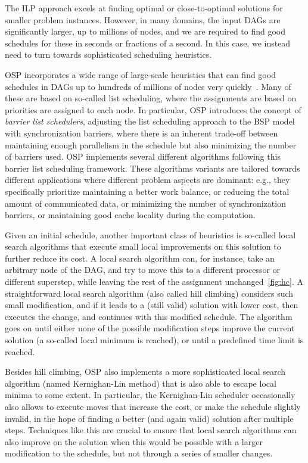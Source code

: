 \documentclass[oneside,reqno, a4paper]{amsart}
\numberwithin{equation}{section}
\begin{document}
The ILP approach excels at finding optimal or close-to-optimal solutions for smaller problem instances. However, in many domains, the input DAGs are significantly larger, up to millions of nodes, and we are required to find good schedules for these in seconds or fractions of a second. In this case, we instead need to turn towards sophisticated scheduling heuristics.

OSP incorporates a wide range of large-scale heuristics that can find good schedules in DAGs up to hundreds of millions of nodes very quickly~\cite{BSP_algos_opdas,sptrsv_opdas}. Many of these are based on so-called list scheduling, where the assignments are based on priorities are assigned to each node. In particular, OSP introduces the concept of \emph{barrier list schedulers}, adjusting the list scheduling approach to the BSP model with synchronization barriers, where there is an inherent trade-off between maintaining enough parallelism in the schedule but also minimizing the number of barriers used. OSP implements several different algorithms following this barrier list scheduling framework. These algorithms variants are tailored towards different applications where different problem aspects are dominant: e.g., they specifically prioritize maintaining a better work balance, or reducing the total amount of communicated data, or minimizing the number of synchronization barriers, or maintaining good cache locality during the computation.

Given an initial schedule, another important class of heuristics is so-called local search algorithms that execute small local improvements on this solution to further reduce its cost. A local search algorithm can, for instance, take an arbitrary node of the DAG, and try to move this to a different processor or different superstep, while leaving the rest of the assignment unchanged~\ref{fig:hc}. A straightforward local search algorithm (also called hill climbing) considers such small modification, and if it leads to a (still valid) solution with lower cost, then executes the change, and continues with this modified schedule. The algorithm goes on until either none of the possible modification steps improve the current solution (a so-called local minimum is reached), or until a predefined time limit is reached.

Besides hill climbing, OSP also implements a more sophisticated local search algorithm (named Kernighan-Lin method) that is also able to escape local minima to some extent. In particular, the Kernighan-Lin scheduler occasionally also allows to execute moves that increase the cost, or make the schedule slightly invalid, in the hope of finding a better (and again valid) solution after multiple steps. Techniques like this are crucial to ensure that local search algorithms can also improve on the solution when this would be possible with a larger modification to the schedule, but not through a series of smaller changes.
\end{document}
